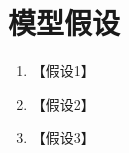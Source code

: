 \section{模型假设}

\begin{enumerate}[label=\arabic*.]
    \item 【假设1】
    \item 【假设2】
    \item 【假设3】
\end{enumerate}
